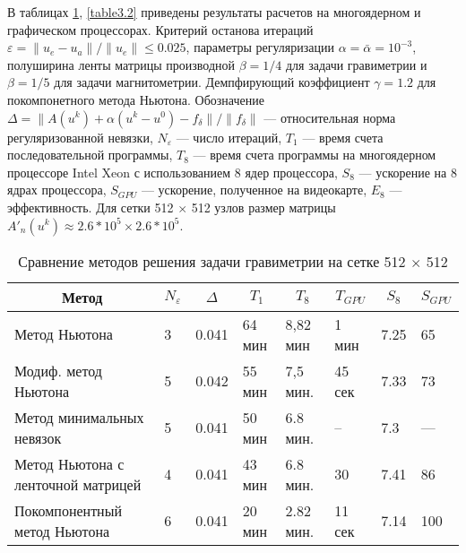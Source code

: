 В таблицах \ref{table3.1}, \ref{table3.2} приведены результаты расчетов на многоядерном и графическом процессорах. Критерий останова итераций $\varepsilon=\|u_e-u_a\|/\|u_e\|\le 0.025$, параметры регуляризации $\alpha=\bar{\alpha}=10^{-3}$, полуширина ленты матрицы производной $\beta=1/4$ для задачи гравиметрии и $\beta=1/5$ для задачи магнитометрии. Демпфирующий коэффициент $\gamma=1.2$ для покомпонетного метода Ньютона. Обозначение $\Delta=\|A(u^k)+\alpha(u^k-u^0)-f_\delta\|/\|f_\delta\|$ --- относительная норма регуляризованной невязки, $N_\varepsilon$ --- число итераций, $T_1$ --- время счета последовательной программы, $T_8$ --- время счета программы на многоядерном процессоре Intel Xeon с использованием 8 ядер процессора, $S_8$ --- ускорение на 8 ядрах процессора, $S_{GPU}$ --- ускорение, полученное на видеокарте, $E_8$ --- эффективность. Для сетки 512 $\times$ 512 узлов размер матрицы  $A'_n(u^k)\approx 2.6*10^5\times2.6*10^5$.
\begin{table}[]
	\centering
	\renewcommand{\arraystretch}{1.5}
	\caption{Сравнение методов решения задачи гравиметрии на сетке 512 $\times$ 512}
	\label{table3.1}
	\begin{tabular}{|p{}|l|l|l|l|l|l|l|}
		\hline
		\multicolumn{1}{|c|}{Метод}        & \multicolumn{1}{c|}{$N_\varepsilon$} &
		\multicolumn{1}{c|}{$\Delta$} & \multicolumn{1}{c|}{$T_1$} & \multicolumn{1}{c|}{$T_8$} &
		\multicolumn{1}{c|}{$T_{GPU}$} &
		\multicolumn{1}{c|}{$S_8$} & \multicolumn{1}{c|}{$S_{GPU}$}
		\\ \hline
		Метод Ньютона                      &  3        & 0.041                          &       64 мин                  &     8,82 мин &
		1 мин & 7.25 & 65 \\ \hline
		Модиф. метод Ньютона     &         5           & 0.042            & 55 мин                  & 7,5 мин.    &
		45 сек & 7.33 & 73             \\ \hline
		Метод минимальных невязок &  5               & 0.041                    & 50 мин  & 6.8 мин.  &  --   & 7.3 & ---            \\ \hline
		Метод Ньютона с ленточной матрицей &  4               & 0.041                    & 43 мин                  & 6.8 мин. & 30   & 7.41 & 86        \\ \hline
		Покомпонентный метод Ньютона &  6               & 0.041                    & 20 мин  & 2.82 мин.  &  11 сек   & 7.14 & 100            \\ \hline
	\end{tabular}
\end{table}
